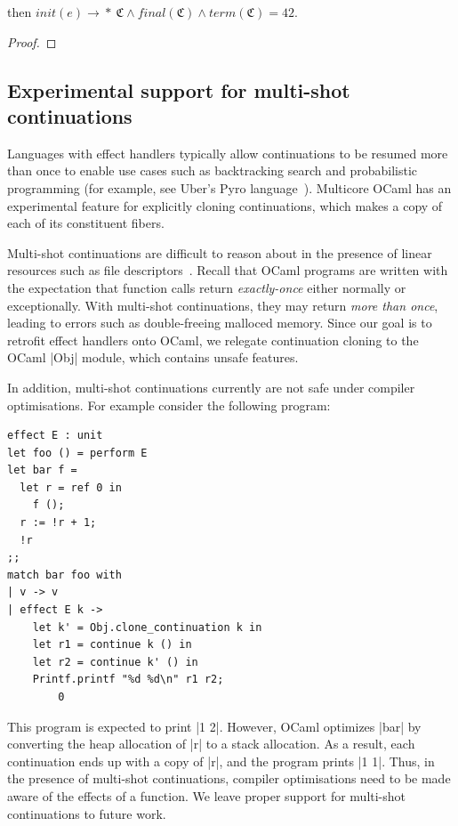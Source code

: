 \documentclass[sigplan,screen]{acmart}
\newcommand{\config}{\mathfrak{C}}
\newcommand{\multistep}{\rightarrow\!\!*}
\begin{document}
then $init(e) \multistep ~\config \wedge final(\config) \wedge term(\config) =
42$.

\begin{proof}
\end{proof}

\subsection*{Experimental support for multi-shot continuations}

Languages with effect handlers typically allow continuations to be resumed more
than once to enable use cases such as backtracking search and probabilistic
programming (for example, see Uber's Pyro language~\cite{Pyro}). Multicore
OCaml has an experimental feature for explicitly cloning continuations, which
makes a copy of each of its constituent fibers.

Multi-shot continuations are difficult to
reason about in the presence of linear resources such as file descriptors~\cite{de-vilhena-pottier-21}.
Recall that OCaml programs are written with the expectation that function calls
return \emph{exactly-once} either normally or exceptionally. With multi-shot
continuations, they may return \emph{more than once}, leading to errors such as
double-freeing malloced memory. Since our goal is to retrofit effect handlers
onto OCaml, we relegate continuation cloning to the OCaml |Obj| module, which
contains unsafe features.

In addition, multi-shot continuations currently are not safe under compiler
optimisations. For example consider the following program:

\begin{minipage}{\linewidth}
\begin{lstlisting}
effect E : unit
let foo () = perform E
let bar f =
  let r = ref 0 in
	f ();
  r := !r + 1;
  !r
;;
match bar foo with
| v -> v
| effect E k ->
    let k' = Obj.clone_continuation k in
    let r1 = continue k () in
    let r2 = continue k' () in
    Printf.printf "%d %d\n" r1 r2;
		0
\end{lstlisting}
\end{minipage}

This program is expected to print |1 2|. However, OCaml optimizes |bar| by
converting the heap allocation of |r| to a stack allocation. As a result, each
continuation ends up with a copy of |r|, and the program prints |1 1|. Thus, in
the presence of multi-shot continuations, compiler optimisations need to be
made aware of the effects of a function. We leave proper support for multi-shot
continuations to future work.
\fi
\end{document}
